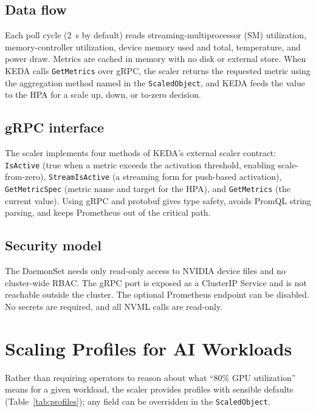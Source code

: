 \documentclass[11pt]{article}
\begin{document}
\subsection{Data flow}
Each poll cycle (2~s by default) reads streaming-multiprocessor (SM) utilization,
memory-controller utilization, device memory used and total, temperature, and
power draw. Metrics are cached in memory with no disk or external store. When KEDA
calls \texttt{GetMetrics} over gRPC, the scaler returns the requested metric using
the aggregation method named in the \texttt{ScaledObject}, and KEDA feeds the
value to the HPA for a scale up, down, or to-zero decision.

\subsection{gRPC interface}
The scaler implements four methods of KEDA's external scaler contract:
\texttt{IsActive} (true when a metric exceeds the activation threshold, enabling
scale-from-zero), \texttt{StreamIsActive} (a streaming form for push-based
activation), \texttt{GetMetricSpec} (metric name and target for the HPA), and
\texttt{GetMetrics} (the current value). Using gRPC and protobuf gives type
safety, avoids PromQL string parsing, and keeps Prometheus out of the critical
path.

\subsection{Security model}
The DaemonSet needs only read-only access to NVIDIA device files and no
cluster-wide RBAC. The gRPC port is exposed as a ClusterIP Service and is not
reachable outside the cluster. The optional Prometheus endpoint can be disabled.
No secrets are required, and all NVML calls are read-only.

\section{Scaling Profiles for AI Workloads}

Rather than requiring operators to reason about what ``80\% GPU utilization''
means for a given workload, the scaler provides profiles with sensible defaults
(Table~\ref{tab:profiles}); any field can be overridden in the
\texttt{ScaledObject}.
\end{document}
